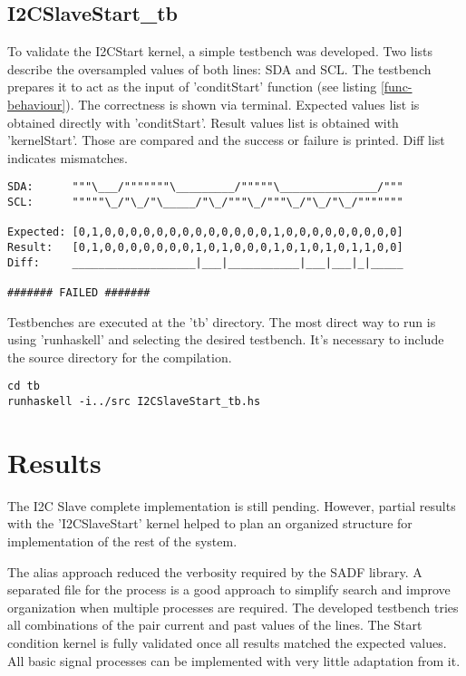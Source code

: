 \documentclass{article}
\begin{document}
\subsection{I2CSlaveStart\_tb}

To validate the I2CStart kernel, a simple testbench was developed. Two lists describe the oversampled values of both lines: SDA and SCL. The testbench prepares it to act as the input of 'conditStart' function (see listing \ref{func-behaviour}).
The correctness is shown via terminal. Expected values list is obtained directly with 'conditStart'. Result values list is obtained with 'kernelStart'. Those are compared and the success or failure is printed. Diff list indicates mismatches.

\begin{lstlisting}[frame=single, basicstyle=\small, caption={I2CSlaveStart\_tb failure screen example}, captionpos=b]
SDA:      """\___/"""""""\_________/"""""\_______________/"""
SCL:      """""\_/"\_/"\_____/"\_/"""\_/"""\_/"\_/"\_/"""""""

Expected: [0,1,0,0,0,0,0,0,0,0,0,0,0,0,0,1,0,0,0,0,0,0,0,0,0]
Result:   [0,1,0,0,0,0,0,0,0,1,0,1,0,0,0,1,0,1,0,1,0,1,1,0,0]
Diff:     ___________________|___|___________|___|___|_|_____

####### FAILED #######
\end{lstlisting}

Testbenches are executed at the 'tb' directory. The most direct way to run is using 'runhaskell' and selecting the desired testbench. It's necessary to include the source directory for the compilation.

\begin{lstlisting}[frame=single, basicstyle=\small, caption={How to run testbench}, captionpos=b]
cd tb
runhaskell -i../src I2CSlaveStart_tb.hs
\end{lstlisting}


\section{Results} \label{sec-resul}
The I2C Slave complete implementation is still pending. However, partial results with the 'I2CSlaveStart' kernel helped to plan an organized structure for implementation of the rest of the system. 

The alias approach reduced the verbosity required by the SADF library. A separated file for the process is a good approach to simplify search and improve organization when multiple processes are required.
The developed testbench tries all combinations of the pair current and past values of the lines. The Start condition kernel is fully validated once all results matched the expected values. All basic signal processes can be implemented with very little adaptation from it.
\end{document}
